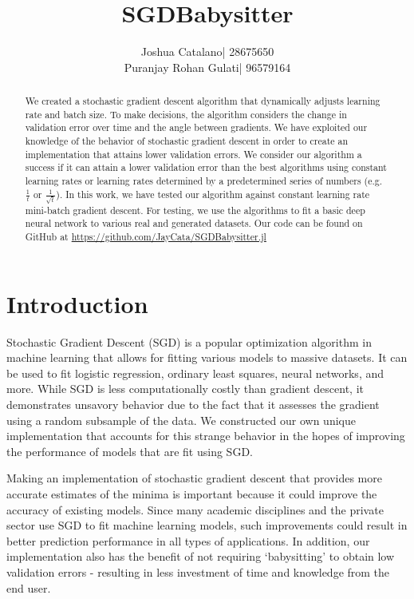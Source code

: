 \documentclass{article}
\title{SGDBabysitter}
\author{
	\begin{tabular}{rl}
			Joshua Catalano &|  28675650 \\
		Puranjay Rohan Gulati &|  96579164
	\end{tabular}
}
\begin{document}
 
 \maketitle 
 
 \begin{abstract} 
 	We created a stochastic gradient descent algorithm that dynamically adjusts learning rate and batch size. To make decisions, the algorithm considers the change in validation error over time and the angle between gradients. We have exploited our knowledge of the behavior of stochastic gradient descent in order to create an implementation that attains lower validation errors. We consider our algorithm a success if it can attain a lower validation error than the best algorithms using constant learning rates or learning rates determined by a predetermined series of numbers (e.g. $\frac{1}{t}$ or $\frac{1}{\sqrt{t}}$). In this work, we have tested our algorithm against constant learning rate mini-batch gradient descent. For testing, we use the algorithms to fit a basic deep neural network to various real and generated datasets. Our code can be found on GitHub at \url{https://github.com/JayCata/SGDBabysitter.jl}
\end{abstract} 

\section{Introduction}  
\par Stochastic Gradient Descent (SGD) is a popular optimization algorithm in machine learning that allows for fitting various models to massive datasets. It can be used to fit logistic regression, ordinary least squares, neural networks, and more. While SGD is less computationally costly than gradient descent, it demonstrates unsavory behavior due to the fact that it assesses the gradient using a random subsample of the data. We constructed our own unique implementation that accounts for this strange behavior in the hopes of improving the performance of models that are fit using SGD. 
\par Making an implementation of stochastic gradient descent that provides more accurate estimates of the minima is important because it could improve the accuracy of existing models. Since many academic disciplines and the private sector use SGD to fit machine learning models, such improvements could result in better prediction performance in all types of applications. In addition, our implementation also has the benefit of not requiring `babysitting' to obtain low validation errors - resulting in less investment of time and knowledge from the end user. 
\end{document}
